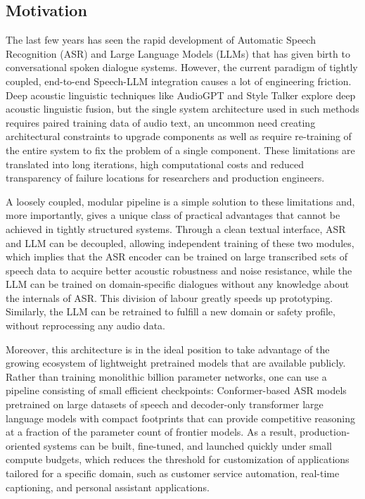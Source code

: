 \subsection{Motivation}
The last few years has seen the rapid development of Automatic Speech Recognition (ASR) and Large Language Models (LLMs) that has given birth to conversational spoken dialogue systems. However, the current paradigm of tightly coupled, end-to-end Speech-LLM integration causes a lot of engineering friction. Deep acoustic linguistic techniques like AudioGPT and Style Talker explore deep acoustic linguistic fusion, but the single system architecture used in such methods requires paired training data of audio text, an uncommon need creating architectural constraints to upgrade components as well as require re-training of the entire system to fix the problem of a single component. These limitations are translated into long iterations, high computational costs and reduced transparency of failure locations for researchers and production engineers.

A loosely coupled, modular pipeline is a simple solution to these limitations and, more importantly, gives a unique class of practical advantages that cannot be achieved in tightly structured systems. Through a clean textual interface, ASR and LLM can be decoupled, allowing independent training of these two modules, which implies that the ASR encoder can be trained on large transcribed sets of speech data to acquire better acoustic robustness and noise resistance, while the LLM can be trained on domain-specific dialogues without any knowledge about the internals of ASR. This division of labour greatly speeds up prototyping. Similarly, the LLM can be retrained to fulfill a new domain or safety profile, without reprocessing any audio data.

Moreover, this architecture is in the ideal position to take advantage of the growing ecosystem of lightweight pretrained models that are available publicly. Rather than training monolithic billion parameter networks, one can use a pipeline consisting of small efficient checkpoints: Conformer-based ASR models pretrained on large datasets of speech and decoder-only transformer large language models with compact footprints that can provide competitive reasoning at a fraction of the parameter count of frontier models. As a result, production-oriented systems can be built, fine-tuned, and launched quickly under small compute budgets, which reduces the threshold for customization of applications tailored for a specific domain, such as customer service automation, real-time captioning, and personal assistant applications.

